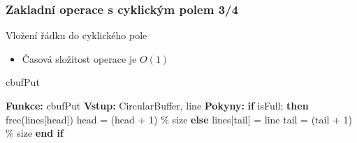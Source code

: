 \documentclass[]{fitthesispresn}
\begin{document}
    \begin{frame}
        \frametitle{Zakladní operace s cyklickým polem 3/4}
        Vložení řádku do cyklického pole
        \begin{itemize}
            \item Časová složitost operace je $O(1)$
        \end{itemize}
        \begin{algorithm}[H]
            \caption{cbufPut}
            \label{alg:cbufPut}
            \begin{algorithmic}[1]
                \State \textbf{Funkce:} cbufPut
                \State \textbf{Vstup:} CircularBuffer, line
                \State \textbf{Pokyny:}
                \State \hspace{\algorithmicindent} \textbf{if} isFull; \textbf{then}
                \State \hspace{\algorithmicindent} \hspace{\algorithmicindent} free(lines[head])
                \State \hspace{\algorithmicindent} \hspace{\algorithmicindent} head = (head + 1) \% size
                \State \hspace{\algorithmicindent} \textbf{else}
                \State \hspace{\algorithmicindent} \hspace{\algorithmicindent}  lines[tail] = line
                \State \hspace{\algorithmicindent} \hspace{\algorithmicindent}  tail = (tail + 1) \% size
                \State \hspace{\algorithmicindent} \textbf{end if}
            \end{algorithmic}
        \end{algorithm}
    \end{frame}
\end{document}
